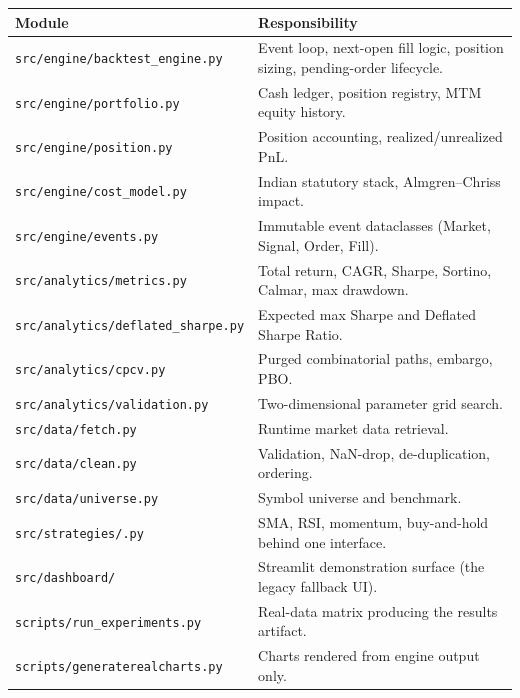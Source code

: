 \documentclass[12pt,a4paper,oneside]{report}
\begin{document}
\begin{center}
\begin{longtable}{@{}p{4.6cm}p{8.3cm}@{}}
\toprule
\textbf{Module} & \textbf{Responsibility} \\
\midrule
\endfirsthead
\texttt{src/\allowbreak engine/\allowbreak backtest\_engine.py} & Event loop, next-open fill logic, position sizing, pending-order lifecycle. \\
\texttt{src/\allowbreak engine/\allowbreak portfolio.py} & Cash ledger, position registry, MTM equity history. \\
\texttt{src/\allowbreak engine/\allowbreak position.py} & Position accounting, realized/unrealized PnL. \\
\texttt{src/\allowbreak engine/\allowbreak cost\_model.py} & Indian statutory stack, Almgren--Chriss impact. \\
\texttt{src/\allowbreak engine/\allowbreak events.py} & Immutable event dataclasses (Market, Signal, Order, Fill). \\
\texttt{src/\allowbreak analytics/\allowbreak metrics.py} & Total return, CAGR, Sharpe, Sortino, Calmar, max drawdown. \\
\texttt{src/\allowbreak analytics/\allowbreak deflated\_sharpe.py} & Expected max Sharpe and Deflated Sharpe Ratio. \\
\texttt{src/\allowbreak analytics/\allowbreak cpcv.py} & Purged combinatorial paths, embargo, PBO. \\
\texttt{src/\allowbreak analytics/\allowbreak validation.py} & Two-dimensional parameter grid search. \\
\texttt{src/\allowbreak data/\allowbreak fetch.py} & Runtime market data retrieval. \\
\texttt{src/\allowbreak data/\allowbreak clean.py} & Validation, NaN-drop, de-duplication, ordering. \\
\texttt{src/\allowbreak data/\allowbreak universe.py} & Symbol universe and benchmark. \\
\texttt{src/\allowbreak strategies/\allowbreak *.py} & SMA, RSI, momentum, buy-and-hold behind one interface. \\
\texttt{src/\allowbreak dashboard/} & Streamlit demonstration surface (the legacy fallback UI). \\
\texttt{scripts/\allowbreak run\_experiments.py} & Real-data matrix producing the results artifact. \\
\texttt{scripts/\allowbreak generate\-\allowbreak real\-\allowbreak charts.py} & Charts rendered from engine output only. \\
\bottomrule
\end{longtable}
\end{center}
\end{document}
